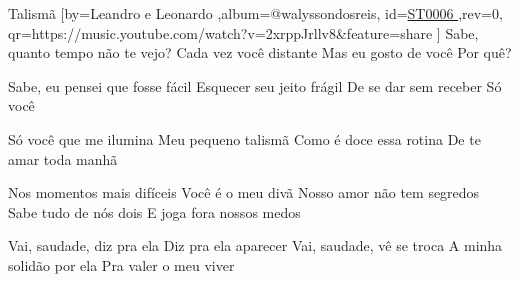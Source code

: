 \beginsong
{Talismã %
}[by={Leandro e Leonardo %
},album={@walyssondosreis},
id={\href{https://music.youtube.com/watch?v=2xrppJrllv8&feature=share %
}{ST0006 %
}},rev={0}, %
qr={https://music.youtube.com/watch?v=2xrppJrllv8&feature=share %
}]
\beginverse
Sabe, quanto tempo não te vejo?
Cada vez você distante
Mas eu gosto de você
Por quê?
\endverse

\beginverse
Sabe, eu pensei que fosse fácil
Esquecer seu jeito frágil
De se dar sem receber
Só você
\endverse

\beginverse
Só você que me ilumina
Meu pequeno talismã
Como é doce essa rotina
De te amar toda manhã
\endverse

\beginverse
Nos momentos mais difíceis
Você é o meu divã
Nosso amor não tem segredos
Sabe tudo de nós dois
E joga fora nossos medos
\endverse

\beginchorus
Vai, saudade, diz pra ela
Diz pra ela aparecer
Vai, saudade, vê se troca
A minha solidão por ela
Pra valer o meu viver
\endchorus

